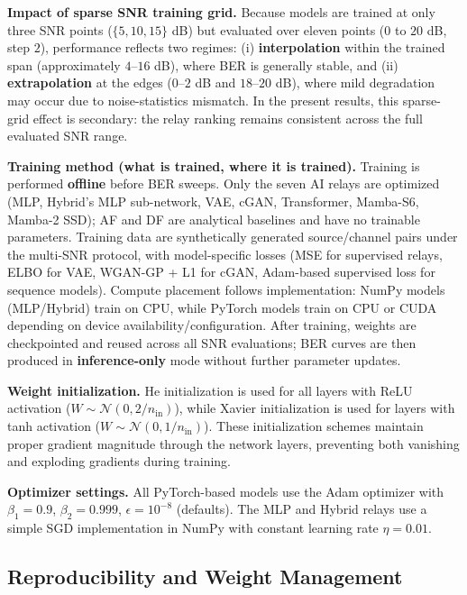 \textbf{Impact of sparse SNR training grid.} Because models are trained at only three SNR points (\(\{5,10,15\}\) dB) but evaluated over eleven points (\(0\) to \(20\) dB, step \(2\)), performance reflects two regimes: (i) \textbf{interpolation} within the trained span (approximately \(4\)--\(16\) dB), where BER is generally stable, and (ii) \textbf{extrapolation} at the edges (\(0\)--\(2\) dB and \(18\)--\(20\) dB), where mild degradation may occur due to noise-statistics mismatch. In the present results, this sparse-grid effect is secondary: the relay ranking remains consistent across the full evaluated SNR range.

\textbf{Training method (what is trained, where it is trained).} Training is performed \textbf{offline} before BER sweeps. Only the seven AI relays are optimized (MLP, Hybrid's MLP sub-network, VAE, cGAN, Transformer, Mamba-S6, Mamba-2 SSD); AF and DF are analytical baselines and have no trainable parameters. Training data are synthetically generated source/channel pairs under the multi-SNR protocol, with model-specific losses (MSE for supervised relays, ELBO for VAE, WGAN-GP + L1 for cGAN, Adam-based supervised loss for sequence models). Compute placement follows implementation: NumPy models (MLP/Hybrid) train on CPU, while PyTorch models train on CPU or CUDA depending on device availability/configuration. After training, weights are checkpointed and reused across all SNR evaluations; BER curves are then produced in \textbf{inference-only} mode without further parameter updates.

\textbf{Weight initialization.} He initialization \cite{He2015DelvingRectifiers} is used for all layers with ReLU activation (\(W \sim \mathcal{N}(0, 2/n_{\text{in}})\)), while Xavier initialization is used for layers with tanh activation (\(W \sim \mathcal{N}(0, 1/n_{\text{in}})\)). These initialization schemes maintain proper gradient magnitude through the network layers, preventing both vanishing and exploding gradients during training.

\textbf{Optimizer settings.} All PyTorch-based models use the Adam optimizer with \(\beta_1 = 0.9\), \(\beta_2 = 0.999\), \(\epsilon = 10^{-8}\) (defaults). The MLP and Hybrid relays use a simple SGD implementation in NumPy with constant learning rate \(\eta = 0.01\).

\subsection{Reproducibility and Weight Management}\label{sec:reproducibility-and-weight-management}

